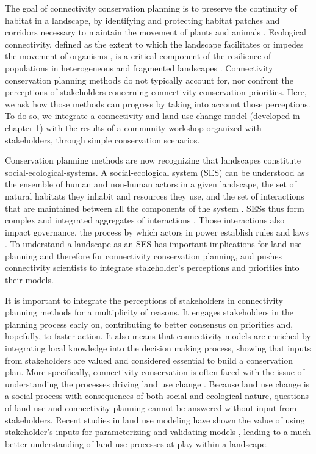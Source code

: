 
The goal of connectivity conservation planning is to preserve the continuity of habitat in a landscape, by identifying and protecting habitat patches and corridors necessary to maintain the movement of plants and animals \citep{keeley_thirty_2019}. Ecological connectivity, defined as the extent to which the landscape facilitates or impedes the movement of organisms \citep{crooks_landscape_2006}, is a critical component of the resilience of populations in heterogeneous and fragmented landscapes \citep{gonzalez_spatial_2017}. Connectivity conservation planning methods do not typically account for, nor confront the perceptions of stakeholders concerning connectivity conservation priorities. Here, we ask how those methods can progress by taking into account those perceptions. To do so, we integrate a connectivity and land use change model (developed in chapter 1) with the results of a community workshop organized with stakeholders, through simple conservation scenarios.

Conservation planning methods are now recognizing that landscapes constitute social-ecological-systems. A social-ecological system (SES) can be understood as the ensemble of human and non-human actors in a given landscape, the set of natural habitats they inhabit and resources they use, and the set of interactions that are maintained between all the components of the system \citep{ostrom_general_2009}. SESs thus form complex and integrated aggregates of interactions \citep{hinkel_enhancing_2014}. Those interactions also impact governance, the process by which actors in power establish rules and laws \citep{bissonnette_comparing_2018}. To understand a landscape as an SES has important implications for land use planning and therefore for connectivity conservation planning, and pushes connectivity scientists to integrate stakeholder’s perceptions and priorities into their models. 

It is important to integrate the perceptions of stakeholders in connectivity planning methods for a multiplicity of reasons. It engages stakeholders in the planning process early on, contributing to better consensus on priorities and, hopefully, to faster action. It also means that connectivity models are enriched by integrating local knowledge into the decision making process, showing that inputs from stakeholders are valued and considered essential to build a conservation plan. More specifically, connectivity conservation is often faced with the issue of understanding the processes driving land use change \citep{worboys_connectivity_2010}. Because land use change is a social process with consequences of both social and ecological nature, questions of land use and connectivity planning cannot be answered without input from stakeholders. Recent studies in land use modeling have shown the value of using stakeholder’s inputs for parameterizing and validating models \citep{hewitt_participatory_2014, voinov_modelling_2010}, leading to a much better understanding of land use processes at play within a landscape.

